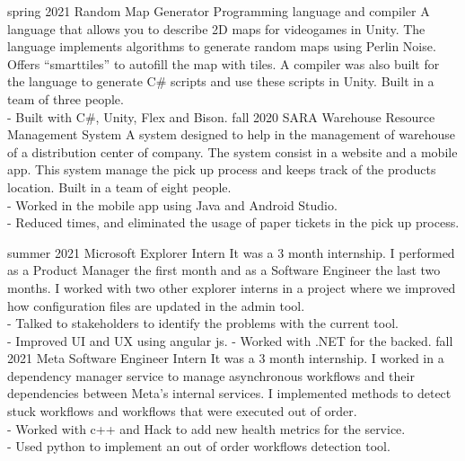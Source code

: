 \documentclass[9pt]{developercv} %
\begin{document}


\begin{entrylist}
	\entry
		{spring 2021}
		{Random Map Generator}
		{Programming language and compiler}
		{A language that allows you to describe 2D maps for videogames in Unity. The language implements algorithms to generate random maps using Perlin Noise. Offers ``smarttiles'' to autofill the map with tiles. A compiler was also built for the language to generate C\# scripts and use these scripts in Unity. Built in a team of three people.\\
		- Built with C\#, Unity, Flex and Bison.}
	\entry
		{fall 2020}
		{SARA}
		{Warehouse Resource Management System}
		{A system designed to help in the management of warehouse of a distribution center of company. The system consist in a website and a mobile app. This system manage the pick up process and keeps track of the products location. Built in a team of eight people.\\
		- Worked in the mobile app using Java and Android Studio.\\
		- Reduced times, and eliminated the usage of paper tickets in the pick up process.
		}
\end{entrylist}


\begin{entrylist}
	\entry
		{summer 2021}
		{Microsoft}
		{Explorer Intern}
		{It was a 3 month internship. I performed as a Product Manager the first month and as a Software Engineer the last two months. I worked with two other explorer interns in a project where we improved how configuration files are updated in the admin tool.\\
		- Talked to stakeholders to identify the problems with the current tool.\\
		- Improved UI and UX using angular js.
		- Worked with .NET for the backed.}
	\entry
		{fall 2021}
		{Meta}
		{Software Engineer Intern}
		{It was a 3 month internship. I worked in a dependency manager service to manage asynchronous workflows and their dependencies between Meta's internal services. I implemented methods to detect stuck workflows and workflows that were executed out of order.\\
		- Worked with c++ and Hack to add new health metrics for the service.\\
		- Used python to implement an out of order workflows detection tool.\\
		}
\end{entrylist}
\end{document}
